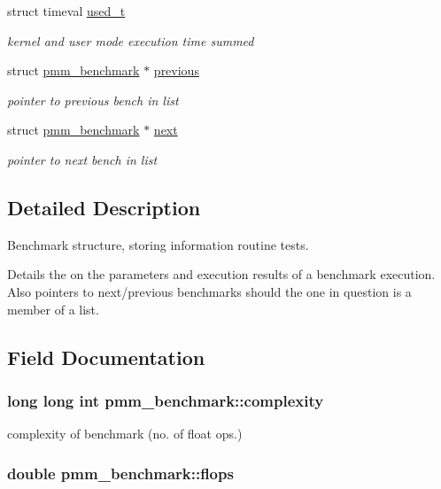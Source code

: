 \begin{DoxyCompactItemize}
struct timeval \hyperlink{structpmm__benchmark_a5ddf544feb0ebedcbb44aab727652fe7}{used\-\_\-t}
\begin{DoxyCompactList}\small\item\em kernel and user mode execution time summed \end{DoxyCompactList}\item 
struct \hyperlink{structpmm__benchmark}{pmm\-\_\-benchmark} $\ast$ \hyperlink{structpmm__benchmark_a03978c97ff1cfa03fd7fffce71044b06}{previous}
\begin{DoxyCompactList}\small\item\em pointer to previous bench in list \end{DoxyCompactList}\item 
struct \hyperlink{structpmm__benchmark}{pmm\-\_\-benchmark} $\ast$ \hyperlink{structpmm__benchmark_aae543e14825b5772d245f7f4756b4a49}{next}
\begin{DoxyCompactList}\small\item\em pointer to next bench in list \end{DoxyCompactList}\end{DoxyCompactItemize}


\subsection{Detailed Description}
Benchmark structure, storing information routine tests.

Details the on the parameters and execution results of a benchmark execution. Also pointers to next/previous benchmarks should the one in question is a member of a list. 

\subsection{Field Documentation}
\hypertarget{structpmm__benchmark_a7c6fd0e47a41583f4abe721aad76b692}{
\subsubsection[{complexity}]{\setlength{\rightskip}{0pt plus 5cm}long long int pmm\-\_\-benchmark\-::complexity}}\label{structpmm__benchmark_a7c6fd0e47a41583f4abe721aad76b692}


complexity of benchmark (no. of float ops.) 

\hypertarget{structpmm__benchmark_a28b204369a2e020588b09bb67a442fcb}{
\subsubsection[{flops}]{\setlength{\rightskip}{0pt plus 5cm}double pmm\-\_\-benchmark\-::flops}}\label{structpmm__benchmark_a28b204369a2e020588b09bb67a442fcb}



